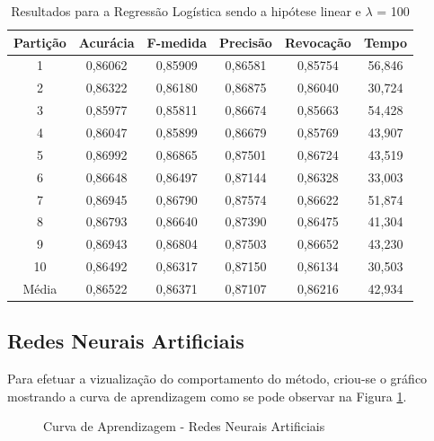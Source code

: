 \begin{table}[h]
\centering
\caption{Resultados para a Regressão Logística sendo a hipótese linear e \(\lambda\) = 100}
\vspace{0.2cm}
\begin{tabular}{c|c|c|c|c|c}
Partição & Acurácia & F-medida & Precisão & Revocação & Tempo \\
\hline
1  & 0,86062 & 0,85909 & 0,86581 & 0,85754 & 56,846 \\      
2  & 0,86322 & 0,86180 & 0,86875 & 0,86040 & 30,724 \\      
3  & 0,85977 & 0,85811 & 0,86674 & 0,85663 & 54,428 \\      
4  & 0,86047 & 0,85899 & 0,86679 & 0,85769 & 43,907 \\      
5  & 0,86992 & 0,86865 & 0,87501 & 0,86724 & 43,519 \\      
6  & 0,86648 & 0,86497 & 0,87144 & 0,86328 & 33,003 \\      
7  & 0,86945 & 0,86790 & 0,87574 & 0,86622 & 51,874 \\    
8  & 0,86793 & 0,86640 & 0,87390 & 0,86475 & 41,304 \\      
9  & 0,86943 & 0,86804 & 0,87503 & 0,86652 & 43,230 \\      
10 & 0,86492 & 0,86317 & 0,87150 & 0,86134 & 30,503 \\
\hline
Média & 0,86522 & 0,86371 & 0,87107 & 0,86216 & 42,934

\end{tabular} 
\label{table:resultadosRL}
\end{table}

\subsection{Redes Neurais Artificiais}
	
Para efetuar a vizualização do comportamento do método, criou-se o gráfico mostrando a curva de aprendizagem como se pode observar na Figura \ref{fig:RNA}.

\begin{figure}[h]
\centering
{}
\caption{Curva de Aprendizagem - Redes Neurais Artificiais}
\label{fig:RNA}
\end{figure}

